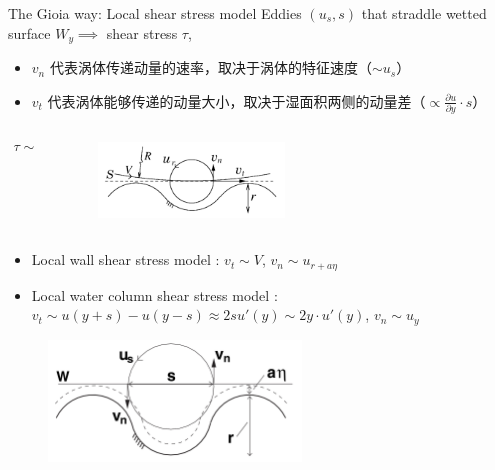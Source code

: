 \documentclass[10pt,xcolor={table,dvipsnames},t]{beamer}
\begin{document}
\begin{frame}{The Gioia way: Local shear stress model}
    Eddies $\left( u_s, s \right) $ that straddle wetted surface $W_y\implies $ shear stress $\tau$,
    \begin{itemize}
        \item $v_n$ 代表涡体传递动量的速率，取决于涡体的特征速度（$\sim u_s$）
        \item $v_t$ 代表涡体能够传递的动量大小，取决于湿面积两侧的动量差（$\propto \frac{\partial u}{\partial y}\cdot s $）
    \end{itemize}
    \begin{columns}
        \begin{column}{0.5\textwidth}
            \begin{align*}
                \tau \sim \rho v_t v_n
            .\end{align*}
        \end{column}
        \begin{column}{0.5\textwidth}
            \begin{figure}[htpb]
                \centering
                \includegraphics[width=0.5\textwidth]{./figures/eddies.png}
                \label{fig:-figures-eddies-png}
            \end{figure}
        \end{column}
    \end{columns}
    \begin{itemize}
        \item Local wall shear stress model \cite{gioiaFriction2006}: $v_t \sim V$, $v_n\sim u_{r+a\eta}$
        \item Local water column shear stress model \cite{gioiaMVP2010}: $v_t\sim u(y+s) - u(y-s)\approx 2s u'(y) \sim 2y\cdot u'(y)$, $v_n \sim u_y$
    \end{itemize}
    \begin{figure}[!htb]
        \centering
        \begin{minipage}{.5\textwidth}
            \centering
            \includegraphics[width=0.6\textwidth]{./figures/wall-shear.png}

\end{minipage}
\end{figure}
\end{frame}
\end{document}
